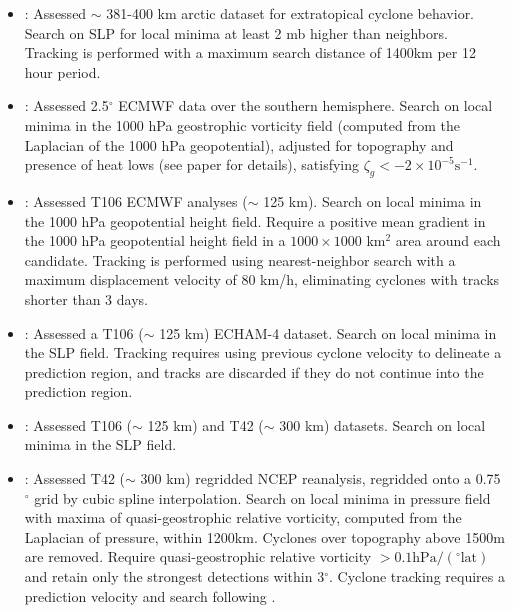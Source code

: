 \documentclass[gmdd, hvmath, online]{copernicus_discussions}
\begin{document}
\begin{itemize}
\item \cite{serreze1993characteristics, serreze1995climatological}:  Assessed $\sim$ 381-400 km arctic dataset for extratopical cyclone behavior.  Search on SLP for local minima at least 2 mb higher than neighbors.  Tracking is performed with a maximum search distance of 1400km per 12 hour period.

\item \cite{sinclair1994objective, sinclair1997objective}:  Assessed 2.5$^\circ$ ECMWF data over the southern hemisphere.  Search on local minima in the 1000 hPa geostrophic vorticity field (computed from the Laplacian of the 1000 hPa geopotential), adjusted for topography and presence of heat lows (see paper for details), satisfying $\zeta_g < -2 \times 10^{-5} \mbox{s}^{-1}$.

\item \cite{blender1997identification}:  Assessed T106 ECMWF analyses ($\sim$ 125 km).  Search on local minima in the 1000 hPa geopotential height field.  Require a positive mean gradient in the 1000 hPa geopotential height field in a $1000 \times 1000$ km$^2$ area around each candidate.  Tracking is performed using nearest-neighbor search with a maximum displacement velocity of 80 km/h, eliminating cyclones with tracks shorter than 3 days.

\item \cite{lionello2002cyclones}:  Assessed a T106 ($\sim$ 125 km) ECHAM-4 dataset.  Search on local minima in the SLP field.  Tracking requires using previous cyclone velocity to delineate a prediction region, and tracks are discarded if they do not continue into the prediction region.

\item \cite{zolina2002improving}:  Assessed T106 ($\sim$ 125 km) and T42 ($\sim$ 300 km) datasets.  Search on local minima in the SLP field.

\item \cite{pinto2005sensitivities}:  Assessed T42 ($\sim$ 300 km) regridded NCEP reanalysis, regridded onto a 0.75$^\circ$ grid by cubic spline interpolation.  Search on local minima in pressure field with maxima of quasi-geostrophic relative vorticity, computed from the Laplacian of pressure, within 1200km.  Cyclones over topography above 1500m are removed.  Require quasi-geostrophic relative vorticity $> 0.1 \mbox{hPa} / (^\circ \mbox{lat})$ and retain only the strongest detections within 3$^\circ$.  Cyclone tracking requires a prediction velocity and search following \cite{murray1991numerical}.


\end{itemize}
\end{document}
